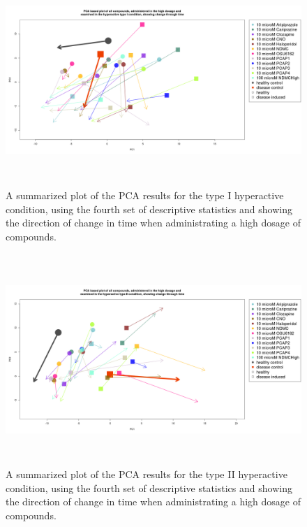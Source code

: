 \documentclass[a4paper,12pt]{article}
\begin{document}
\newpage
\begin{figure}[h!]
\begin{center}
\includegraphics[width=16cm,height=8cm]{All_together_10_microM_DarkApoHigh_in_time_set4.png}
\caption{A summarized plot of the PCA results for the type I hyperactive condition, using the fourth set of descriptive statistics and showing the direction of change in time when administrating a high dosage of compounds.}
\end{center}
\end{figure}
\newpage
\begin{figure}[h!]
\begin{center}
\includegraphics[width=16cm,height=8cm]{All_together_10_microM_DarkPTZ_in_time_set4.png}
\caption{A summarized plot of the PCA results for the type II hyperactive condition, using the fourth set of descriptive statistics and showing the direction of change in time when administrating a high dosage of compounds.}
\end{center}
\end{figure}
\newpage
\end{document}
